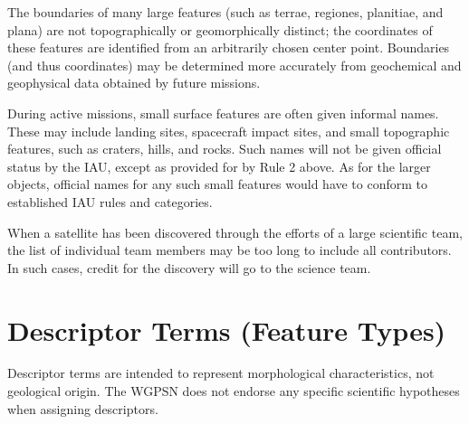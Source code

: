 The boundaries of many large features (such as terrae, regiones, planitiae, and plana) are not topographically or geomorphically distinct; the coordinates of these features are identified from an arbitrarily chosen center point. Boundaries (and thus coordinates) may be determined more accurately from geochemical and geophysical data obtained by future missions.

During active missions, small surface features are often given informal names. These may include landing sites, spacecraft impact sites, and small topographic features, such as craters, hills, and rocks. Such names will not be given official status by the IAU, except as provided for by Rule 2 above. As for the larger objects, official names for any such small features would have to conform to established IAU rules and categories.

When a satellite has been discovered through the efforts of a large scientific team, the list of individual team members may be too long to include all contributors. In such cases, credit for the discovery will go to the science team.

\section{Descriptor Terms (Feature Types)}
\label{sec:Nomenclature:DescriptorTerms}
Descriptor terms are intended to represent morphological characteristics, not geological origin. The WGPSN does not endorse any specific scientific hypotheses when assigning descriptors.

